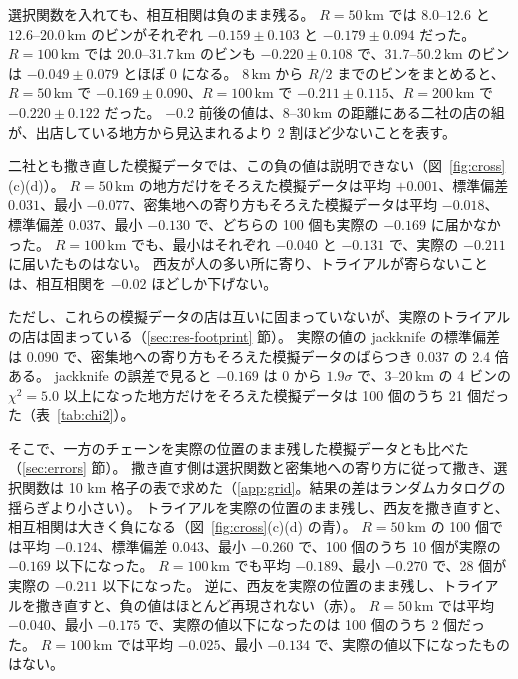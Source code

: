 \documentclass[a4paper,11pt]{ltjsarticle}
\begin{document}
選択関数を入れても、相互相関は負のまま残る。
$R = 50\,\mathrm{km}$ では $8.0$--$12.6$ と $12.6$--$20.0\,\mathrm{km}$ のビンがそれぞれ $-0.159 \pm 0.103$ と $-0.179 \pm 0.094$ だった。
$R = 100\,\mathrm{km}$ では $20.0$--$31.7\,\mathrm{km}$ のビンも $-0.220 \pm 0.108$ で、$31.7$--$50.2\,\mathrm{km}$ のビンは $-0.049 \pm 0.079$ とほぼ $0$ になる。
$8\,\mathrm{km}$ から $R/2$ までのビンをまとめると、$R = 50\,\mathrm{km}$ で $-0.169 \pm 0.090$、$R = 100\,\mathrm{km}$ で $-0.211 \pm 0.115$、$R = 200\,\mathrm{km}$ で $-0.220 \pm 0.122$ だった。
$-0.2$ 前後の値は、$8$--$30\,\mathrm{km}$ の距離にある二社の店の組が、出店している地方から見込まれるより 2 割ほど少ないことを表す。

二社とも撒き直した模擬データでは、この負の値は説明できない（図~\ref{fig:cross}(c)(d)）。
$R = 50\,\mathrm{km}$ の地方だけをそろえた模擬データは平均 $+0.001$、標準偏差 $0.031$、最小 $-0.077$、密集地への寄り方もそろえた模擬データは平均 $-0.018$、標準偏差 $0.037$、最小 $-0.130$ で、どちらの 100 個も実際の $-0.169$ に届かなかった。
$R = 100\,\mathrm{km}$ でも、最小はそれぞれ $-0.040$ と $-0.131$ で、実際の $-0.211$ に届いたものはない。
西友が人の多い所に寄り、トライアルが寄らないことは、相互相関を $-0.02$ ほどしか下げない。

ただし、これらの模擬データの店は互いに固まっていないが、実際のトライアルの店は固まっている（\ref{sec:res-footprint} 節）。
実際の値の jackknife の標準偏差は $0.090$ で、密集地への寄り方もそろえた模擬データのばらつき $0.037$ の 2.4 倍ある。
jackknife の誤差で見ると $-0.169$ は $0$ から $1.9\sigma$ で、$3$--$20\,\mathrm{km}$ の 4 ビンの $\chi^2 = 5.0$ 以上になった地方だけをそろえた模擬データは 100 個のうち 21 個だった（表~\ref{tab:chi2}）。

そこで、一方のチェーンを実際の位置のまま残した模擬データとも比べた（\ref{sec:errors} 節）。
撒き直す側は選択関数と密集地への寄り方に従って撒き、選択関数は 10 km 格子の表で求めた（\ref{app:grid}。結果の差はランダムカタログの揺らぎより小さい）。
トライアルを実際の位置のまま残し、西友を撒き直すと、相互相関は大きく負になる（図~\ref{fig:cross}(c)(d) の青）。
$R = 50\,\mathrm{km}$ の 100 個では平均 $-0.124$、標準偏差 $0.043$、最小 $-0.260$ で、100 個のうち 10 個が実際の $-0.169$ 以下になった。
$R = 100\,\mathrm{km}$ でも平均 $-0.189$、最小 $-0.270$ で、28 個が実際の $-0.211$ 以下になった。
逆に、西友を実際の位置のまま残し、トライアルを撒き直すと、負の値はほとんど再現されない（赤）。
$R = 50\,\mathrm{km}$ では平均 $-0.040$、最小 $-0.175$ で、実際の値以下になったのは 100 個のうち 2 個だった。
$R = 100\,\mathrm{km}$ では平均 $-0.025$、最小 $-0.134$ で、実際の値以下になったものはない。
\end{document}
